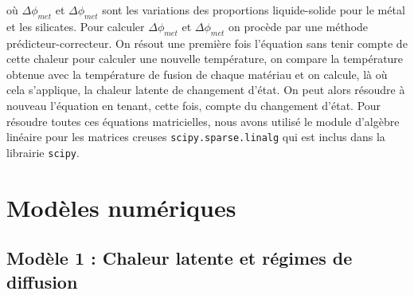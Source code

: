 \documentclass[10pt,a4paper]{article}
\numberwithin{equation}{section}
\begin{document}
où $\Delta \phi_{met}$ et $\Delta \phi_{met}$ sont les variations des proportions liquide-solide pour le métal et les silicates. Pour calculer $\Delta \phi_{met}$ et $\Delta \phi_{met}$ on procède par une méthode prédicteur-correcteur. On résout une première fois l'équation sans tenir compte de cette chaleur pour calculer une nouvelle température, on compare la température obtenue avec la température de fusion de chaque matériau et on calcule, là où cela s'applique, la chaleur latente de changement d'état. On peut alors résoudre à nouveau l'équation en tenant, cette fois, compte du changement d'état. Pour résoudre toutes ces équations matricielles, nous avons utilisé le module d'algèbre linéaire pour les matrices creuses \texttt{scipy.sparse.linalg} qui est inclus dans la librairie \texttt{scipy}.


\section{Modèles numériques}

\subsection{Modèle 1 : Chaleur latente et régimes de diffusion}
\end{document}
